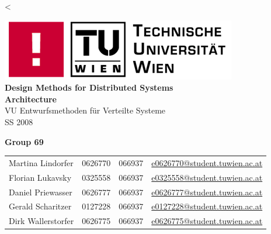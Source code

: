 <\documentclass[a4paper]{article}
\begin{document}
\begin{titlepage}
	\bigskip
	\bigskip
	\bigskip
	\begin{center}
		\includegraphics{informatik-tuwien.png}\\
		\vspace{1cm}
		\Huge{\textsf{\textbf{Design Methods for Distributed Systems\\}}}
		\vspace{1cm}
		\huge{\textsf{\textbf{Architecture\\}}}
		\vspace{1cm}
		\LARGE{\textsf{VU Entwurfsmethoden f\"{u}r Verteilte Systeme\\}}
		\vspace{1cm}
		\Large{\textsf{SS 2008\\}}
	\end{center}
	\vfill
	\begin{center}
		\large{\textsf{\textbf{Group 69}}}
	\end{center}
	\begin{tabular}{llll}
	\textsf{Martina Lindorfer} & \textsf{0626770} & \textsf{066937} & \url{e0626770@student.tuwien.ac.at}\\
	\textsf{Florian Lukavsky} & \textsf{0325558} & \textsf{066937} & \url{e0325558@student.tuwien.ac.at}\\
	\textsf{Daniel Priewasser} & \textsf{0626777} & \textsf{066937} & \url{e0626777@student.tuwien.ac.at}\\
	\textsf{Gerald Scharitzer} & \textsf{0127228} & \textsf{066937} & \url{e0127228@student.tuwien.ac.at}\\
	\textsf{Dirk Wallerstorfer} & \textsf{0626775} & \textsf{066937} & \url{e0626775@student.tuwien.ac.at}\\
	\end{tabular}
\end{titlepage}

\clearpage


\pagestyle{fancy}				
\fancyfoot{}
\tableofcontents
\end{document}
